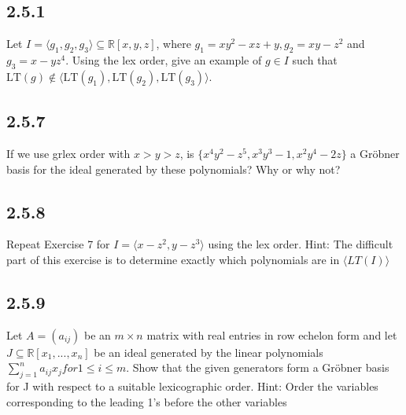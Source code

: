 \documentclass[]{article}
\newcommand\<{\langle}
\renewcommand\>{\rangle}
\newcommand{\RR}{\ensuremath{\mathbb{R}}}
\begin{document}
\subsection*{2.5.1} Let $I = \<g_1,g_2,g_3\> \subseteq \RR[x,y,z]$, where $g_1 = xy^2 - xz + y, g_2 = xy - z^2$ and $g_3 = x - yz^4$. Using the lex order, give an example of $g \in I$ such that $\text{LT}(g) \notin \<\text{LT}(g_1), \text{LT}(g_2), \text{LT}(g_3)\>$.

\subsection*{2.5.7} If we use grlex order with $x > y > z$, is $\{x^4y^2-z^5,x^3y^3-1,x^2y^4-2z\}$ a Gröbner basis for the ideal generated by these polynomials? Why or why not?

\subsection*{2.5.8} Repeat Exercise 7 for $I = \<x - z^2, y - z^3\>$ using the lex order. Hint: The difficult part of this exercise is to determine exactly which polynomials are in $\<LT(I)\>$

\subsection*{2.5.9} Let $A = (a_{ij})$ be an $m \times n$ matrix with real entries in row echelon form and let $J \subseteq \RR[x_1 , . . . , x_n ]$ be an ideal generated by the linear polynomials $\sum_{j=1}^{n}  a_{ij} x_j for 1 \leq i \leq m$.
Show that the given generators form a Gröbner basis for J with respect to a suitable
lexicographic order. Hint: Order the variables corresponding to the leading 1’s before
the other variables
\end{document}
